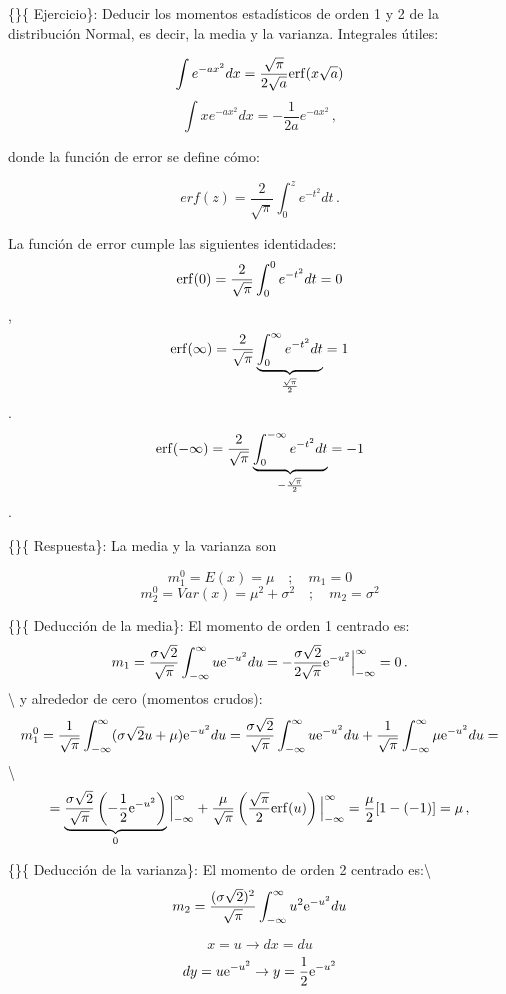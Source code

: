 \documentclass[
]{agujournal2019}
\begin{document}
\{\noindent\}\{ Ejercicio\}: Deducir los momentos estadísticos de orden
1 y 2 de la distribución Normal, es decir, la media y la varianza.
Integrales útiles:

\[\int e^{-ax^2}dx=\frac{\sqrt{\pi}}{2\sqrt{a}}{\rm erf}(x\sqrt{a})\]
\[\int xe^{-ax^2}dx=-\frac{1}{2a}e^{-ax^2}\,,\]

donde la función de error se define cómo:

\[erf(z)=\frac{2}{\sqrt{\pi}}\int_0^z e^{-t^2} dt\,.\]

La función de error cumple las siguientes identidades:
\[{\rm erf}(0)=\frac{2}{\sqrt{\pi}}\int_0^0 e^{-t^2} dt=0\],
\[{\rm erf}(\infty)=\frac{2}{\sqrt{\pi}}\underbrace{\int_0^\infty e^{-t^2} dt}_{\frac{\sqrt{\pi}}{2}}=1\].
\[{\rm erf}(-\infty)=\frac{2}{\sqrt{\pi}}\underbrace{\int_0^{-\infty} e^{-t^2} dt}_{-\frac{\sqrt{\pi}}{2}}=-1\].

\vspace{0.25cm}

\{\noindent\}\{ Respuesta\}: La media y la varianza son

\[m^0_1=E(x)=\mu\,\,\,\,\,\,;\,\,\,\,\,\,m_1=0\]
\[m^0_2=Var(x)=\mu^2 + \sigma^2\,\,\,\,\,\,;\,\,\,\,\,\,m_2=\sigma^2\]

\vspace{0.25cm}

\{\noindent\}\{ Deducción de la media\}: El momento de orden 1 centrado
es:
\[m_1=\frac{\sigma\sqrt{2}}{\sqrt{\pi}}\int^{\infty}_{-\infty}u{\rm e}
   ^{-u^2}du=-\frac{\sigma\sqrt{2}}{2\sqrt{\pi}}{\rm e}
   ^{-u^2}\Big|^{\infty}_{-\infty}=0\,.\] \textbackslash{} y alrededor
de cero (momentos crudos):
\[m^0_1=\frac{1}{\sqrt{\pi}}\int^{\infty}_{-\infty}(\sigma \sqrt{2} u + \mu){\rm e}
   ^{-u^2}du=\frac{\sigma\sqrt{2}}{\sqrt{\pi}}\int^{\infty}_{-\infty}u{\rm e}
   ^{-u^2}du + \frac{1}{\sqrt{\pi}}\int^{\infty}_{-\infty}\mu{\rm e}
   ^{-u^2}du=\] \textbackslash{}
\[=\underbrace{\frac{\sigma\sqrt{2}}{\sqrt{\pi}}\left( -\frac{1}{2}{\rm e}
   ^{-u^2}\right)}_{0} \Big|^{\infty}_{-\infty}+
   \frac{\mu}{\sqrt{\pi}}\left( \frac{\sqrt{\pi}}{2}{\rm erf}(u)\right) \Big|^{\infty}_{-\infty}=
   \frac{\mu}{2}[1-(-1)]=\mu\,,\]

\vspace{0.25cm}

\{\noindent\}\{ Deducción de la varianza\}: El momento de orden 2
centrado es:\textbackslash{}
\[m_2=\frac{(\sigma\sqrt{2})^2}{\sqrt{\pi}}\int^{\infty}_{-\infty}u^2{\rm e}
   ^{-u^2}du\]

\[x=u \rightarrow dx=du\]
\[dy=u{\rm e}^{-u^2} \rightarrow y=\frac{1}{2}{\rm e}^{-u^2}\]
\end{document}
